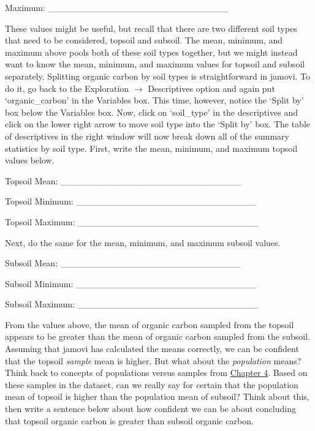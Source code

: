 \documentclass[
  openany]{krantz}
\begin{document}
Maximum: \_\_\_\_\_\_\_\_\_\_\_\_\_\_\_\_\_\_\_\_\_\_\_\_\_\_\_\_

These values might be useful, but recall that there are two different soil types that need to be considered, topsoil and subsoil.
The mean, minimum, and maximum above pools both of these soil types together, but we might instead want to know the mean, minimum, and maximum values for topsoil and subsoil separately.
Splitting organic carbon by soil types is straightforward in jamovi.
To do it, go back to the Exploration \(\to\) Descriptives option and again put `organic\_carbon' in the Variables box.
This time, however, notice the `Split by' box below the Variables box.
Now, click on `soil\_type' in the descriptives and click on the lower right arrow to move soil type into the `Split by' box.
The table of descriptives in the right window will now break down all of the summary statistics by soil type.
First, write the mean, minimum, and maximum topsoil values below.

Topsoil Mean: \_\_\_\_\_\_\_\_\_\_\_\_\_\_\_\_\_\_\_\_\_\_\_\_\_\_\_\_

Topsoil Minimum: \_\_\_\_\_\_\_\_\_\_\_\_\_\_\_\_\_\_\_\_\_\_\_\_\_\_\_\_

Topsoil Maximum: \_\_\_\_\_\_\_\_\_\_\_\_\_\_\_\_\_\_\_\_\_\_\_\_\_\_\_\_

Next, do the same for the mean, minimum, and maximum subsoil values.

Subsoil Mean: \_\_\_\_\_\_\_\_\_\_\_\_\_\_\_\_\_\_\_\_\_\_\_\_\_\_\_\_

Subsoil Minimum: \_\_\_\_\_\_\_\_\_\_\_\_\_\_\_\_\_\_\_\_\_\_\_\_\_\_\_\_

Subsoil Maximum: \_\_\_\_\_\_\_\_\_\_\_\_\_\_\_\_\_\_\_\_\_\_\_\_\_\_\_\_

From the values above, the mean of organic carbon sampled from the topsoil appears to be greater than the mean of organic carbon sampled from the subsoil.
Assuming that jamovi has calculated the means correctly, we can be confident that the topsoil \emph{sample} mean is higher.
But what about the \emph{population} means?
Think back to concepts of populations versus samples from \protect\hyperlink{Chapter_4}{Chapter 4}.
Based on these samples in the dataset, can we really say for certain that the population mean of topsoil is higher than the population mean of subsoil?
Think about this, then write a sentence below about how confident we can be about concluding that topsoil organic carbon is greater than subsoil organic carbon.

\begin{verbatim}




\end{verbatim}
\end{document}
